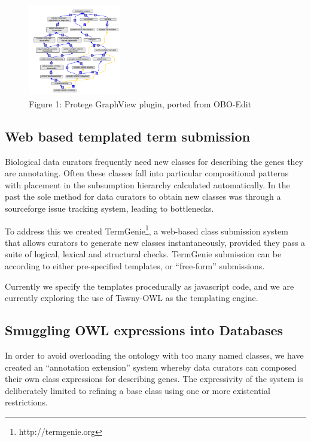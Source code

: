\documentclass{llncs}
\begin{document}
\begin{figure}
\label{gv}
\center
\includegraphics[height=4cm]{gv-plugin}
\caption{Figure 1: Protege GraphView plugin, ported from OBO-Edit}
\end{figure}

\subsection{Web based templated term submission}

Biological data curators frequently need new classes for describing
the genes they are annotating. Often these classes fall into
particular compositional patterns with placement in the subsumption
hierarchy calculated automatically. In the past the sole method for
data curators to obtain new classes was through a sourceforge issue
tracking system, leading to bottlenecks.

To address this we created TermGenie\cite{Dietze2014}\footnote{http://termgenie.org}, a web-based
class submission system that allows curators to generate new classes
instantaneously, provided they pass a suite of logical, lexical and
structural checks. TermGenie submission can be according to either
pre-specified templates, or ``free-form'' submissions.

Currently we specify the templates procedurally as javascript code,
and we are currently exploring the use of Tawny-OWL\cite{lord2013semantic} as the
templating engine.


\subsection{Smuggling OWL expressions into Databases}

In order to avoid overloading the ontology with too many named
classes, we have created an ``annotation extension'' system whereby
data curators can composed their own class expressions for describing
genes\cite{Huntley2014}. The expressivity of the system is
deliberately limited to refining a base class using one or more
existential restrictions.
\end{document}
